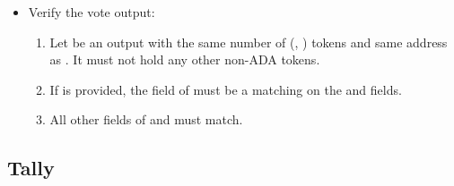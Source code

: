 \documentclass[../hydrozoa.tex]{subfiles}
\begin{document}
\begin{itemize}
\begin{enumerate}[resume]
      \item Let  be an \emph{optional} redeemer argument with this type:%
        \footnote{These types are defined in \cref{h:l2-blocks} and repeated here.}
        \begin{equation*}
        \begin{split}
          \T{MinorBlockL1Effect} &\coloneq \left\{
            \begin{array}{lll}
              \T{blockHeader} &::& \T{BlockHeader^{L2}} \\
              \T{multisig} &::& [\T{Signature}]
            \end{array}\right\}\\
          \blockHeaderTypeName{} &\coloneq \blockHeaderTypeBody{}
        \end{split}
        \end{equation*}
      \item If  is provided, then both of these must hold:
        \begin{enumerate}
          \item The  field of  must have signatures of the  field of  for all the public keys in the  field of .
          \item The  field must match between  and .
        \end{enumerate}
    \end{enumerate}
  \item Verify the vote output:
    \begin{enumerate}[resume]
      \item Let  be an output with the same number of (, ) tokens and same address as .
      It must not hold any other non-ADA tokens.
      \item If  is provided, the  field of  must be a  matching  on the  and  fields.
      \item All other fields of  and  must match.
    \end{enumerate}
\end{itemize}

\subsection{Tally}%
\label{h:l1-dispute-resolution-tally-redeemer}%
\end{document}
